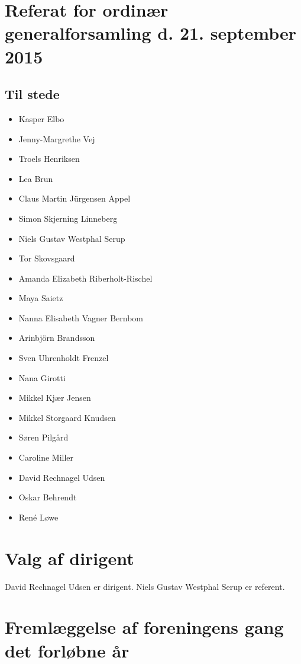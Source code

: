 \documentclass[a4paper,11pt]{report}
\begin{document}
\section*{Referat for ordinær generalforsamling d. 21. september 2015}

\subsection*{Til stede}

\begin{itemize}
\item Kasper Elbo
\item Jenny-Margrethe Vej
\item Troels Henriksen
\item Lea Brun
\item Claus Martin Jürgensen Appel
\item Simon Skjerning Linneberg
\item Niels Gustav Westphal Serup
\item Tor Skovsgaard
\item Amanda Elizabeth Riberholt-Rischel
\item Maya Saietz
\item Nanna Elisabeth Vagner Bernbom
\item Arinbjörn Brandsson
\item Sven Uhrenholdt Frenzel
\item Nana Girotti
\item Mikkel Kjær Jensen
\item Mikkel Storgaard Knudsen
\item Søren Pilgård
\item Caroline Miller
\item David Rechnagel Udsen
\item Oskar Behrendt
\item René Løwe
\end{itemize}

\newpage

\section*{Valg af dirigent}

David Rechnagel Udsen er dirigent.  Niels Gustav Westphal Serup er referent.

\section*{Fremlæggelse af foreningens gang det forløbne år}
\end{document}
